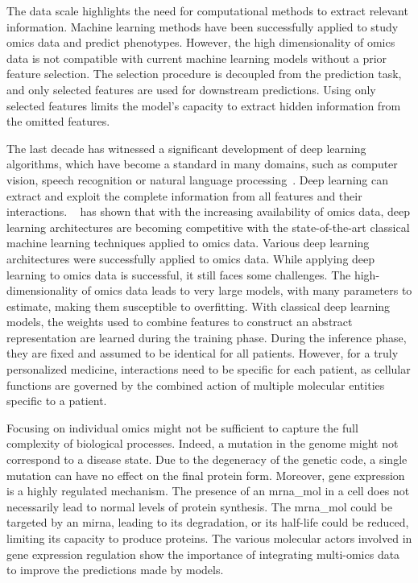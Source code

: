 \documentclass[../main.tex]{subfiles}
\begin{document}
	The data scale highlights the need for computational methods to extract relevant information.
	Machine learning methods have been successfully applied to study omics data and predict phenotypes.
	However, the high dimensionality of omics data is not compatible with current machine learning models without a prior feature selection.
	The selection procedure is decoupled from the prediction task, and only selected features are used for downstream predictions.
	Using only selected features limits the model's capacity to extract hidden information from the omitted features.

	The last decade has witnessed a significant development of deep learning algorithms, which have become a standard in many domains, such as computer vision, speech recognition or natural language processing~\cite{lecunDeepLearning2015}.
	Deep learning can extract and exploit the complete information from all features and their interactions.
	\citeauthor{Hanczar2022}~\cite{Hanczar2022} has shown that with the increasing availability of omics data, deep learning architectures are becoming competitive with the state-of-the-art classical machine learning techniques applied to omics data.
	Various deep learning architectures were successfully applied to omics data.
	While applying deep learning to omics data is successful, it still faces some challenges.
	The high-dimensionality of omics data leads to very large models, \ie{}with many parameters to estimate, making them susceptible to overfitting.
	With classical deep learning models, the weights used to combine features to construct an abstract representation are learned during the training phase.
	During the inference phase, they are fixed and assumed to be identical for all patients.
	However, for a truly personalized medicine, interactions need to be specific for each patient, as cellular functions are governed by the combined action of multiple molecular entities specific to a patient.

	Focusing on individual omics might not be sufficient to capture the full complexity of biological processes.
	Indeed, a mutation in the genome might not correspond to a disease state.
	Due to the degeneracy of the genetic code, a single mutation can have no effect on the final protein form.
	Moreover, gene expression is a highly regulated mechanism.
	The presence of an \gls{mrna_mol} in a cell does not necessarily lead to normal levels of protein synthesis.
	The \gls{mrna_mol} could be targeted by an \gls{mirna}, leading to its degradation, or its half-life could be reduced, limiting its capacity to produce proteins.
	The various molecular actors involved in gene expression regulation show the importance of integrating multi-omics data to improve the predictions made by models.
\end{document}
